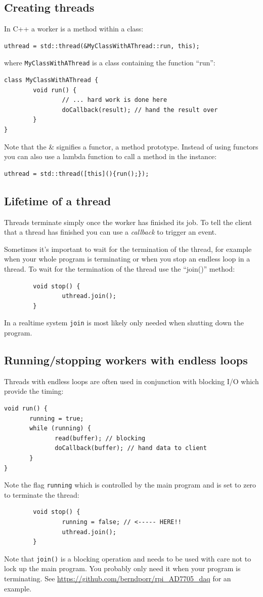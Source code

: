 \documentclass[12pt]{report}
\begin{document}
\subsection{Creating threads}
In C++ a worker is a method within
a class:
\begin{verbatim}
uthread = std::thread(&MyClassWithAThread::run, this);
\end{verbatim}
where \texttt{MyClassWithAThread} is a class containing the function ``run'':
\begin{verbatim}
class MyClassWithAThread {
        void run() {
                // ... hard work is done here
                doCallback(result); // hand the result over
        }
}
\end{verbatim}
Note that the \& signifies a functor, a method prototype.
Instead of using functors you can also use a lambda function
to call a method in the instance:
\begin{verbatim}
uthread = std::thread([this](){run();});
\end{verbatim}


\subsection{Lifetime of a thread}
Threads terminate simply once the worker has finished its job.
To tell the client that a thread has finished you can use a
\textsl{callback} to trigger an event.

Sometimes it's important to wait for the termination of the thread,
for example when your whole program is terminating or when
you stop an endless loop in a thread. To wait for the termination
of the thread use the ``join()'' method:
\begin{verbatim}
        void stop() {
                uthread.join();
        }
\end{verbatim}
In a realtime system \texttt{join} is most likely only needed when shutting down the program.


\subsection{Running/stopping workers with endless loops}
Threads with endless loops are often used in conjunction with blocking
I/O which provide the timing:
\begin{verbatim}
void run() {
       running = true;
       while (running) {
              read(buffer); // blocking
              doCallback(buffer); // hand data to client
       }
}
\end{verbatim}
Note the flag \texttt{running} which is controlled by the main program and is set to zero to terminate
the thread:
\begin{verbatim}
        void stop() {
                running = false; // <----- HERE!!
                uthread.join();
        }
\end{verbatim}
Note that \texttt{join()} is a blocking operation and needs to be used with care not to
lock up the main program. You probably only need it when your program is terminating.
See \url{https://github.com/berndporr/rpi_AD7705_daq} for an example.
\end{document}
